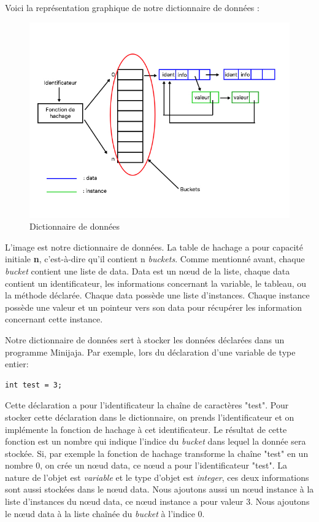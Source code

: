 \documentclass[a4paper,12pt]{report}
\begin{document}
Voici la représentation graphique de notre dictionnaire de données :
\begin{figure}[H]
\begin{center}
	\includegraphics[scale=0.5]{hashmap}
	\caption{Dictionnaire de données}
\end{center}
\end{figure} 

L'image est notre dictionnaire de données. La table de hachage a pour capacité initiale \textbf{n}, c'est-à-dire qu'il contient n \textit{buckets}. Comme mentionné avant, chaque \textit{bucket} contient une liste de data. Data est un nœud de la liste, chaque data contient un identificateur, les informations concernant la variable, le tableau, ou la méthode déclarée. Chaque data possède une liste d'instances. Chaque instance possède une valeur et un pointeur vers son data pour récupérer les information concernant cette instance. 

Notre dictionnaire de données sert à stocker les données déclarées dans un programme Minijaja. Par exemple, lors du déclaration d'une variable de type entier:

\begin{lstlisting}
int test = 3;
\end{lstlisting}

Cette déclaration a pour l'identificateur la chaîne de caractères "test". Pour stocker cette déclaration dans le dictionnaire, on prends l'identificateur et on implémente la fonction de hachage à cet identificateur. Le résultat de cette fonction est un nombre qui indique l'indice du \textit{bucket} dans lequel la donnée sera stockée. Si, par exemple la fonction de hachage transforme la chaîne "test" en un nombre 0, on crée un nœud data, ce nœud a pour l'identificateur "test". La nature de l'objet est \textit{variable} et le type d'objet est \textit{integer}, ces deux informations sont aussi stockées dans le nœud data. Nous ajoutons aussi un nœud instance à la liste d'instances du nœud data, ce nœud instance a pour valeur 3. Nous ajoutons le nœud data à la liste chaînée du \textit{bucket} à l'indice 0.
\end{document}

